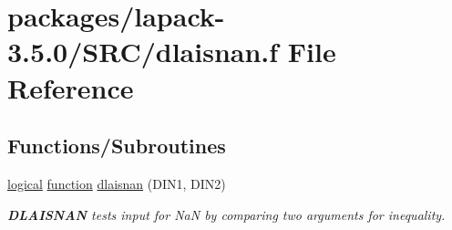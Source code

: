 \hypertarget{dlaisnan_8f}{}\section{packages/lapack-\/3.5.0/\+S\+R\+C/dlaisnan.f File Reference}
\label{dlaisnan_8f}
\subsection*{Functions/\+Subroutines}
\begin{DoxyCompactItemize}
\item 
\hyperlink{tnc_8c_aa7b64cdf39500931f7b333343791a104}{logical} \hyperlink{afunc_8m_a7b5e596df91eadea6c537c0825e894a7}{function} \hyperlink{group__auxOTHERauxiliary_ga341ec834c6fc14a17fead550ff486022}{dlaisnan} (D\+I\+N1, D\+I\+N2)
\begin{DoxyCompactList}\small\item\em {\bfseries D\+L\+A\+I\+S\+N\+A\+N} tests input for Na\+N by comparing two arguments for inequality. \end{DoxyCompactList}\end{DoxyCompactItemize}
